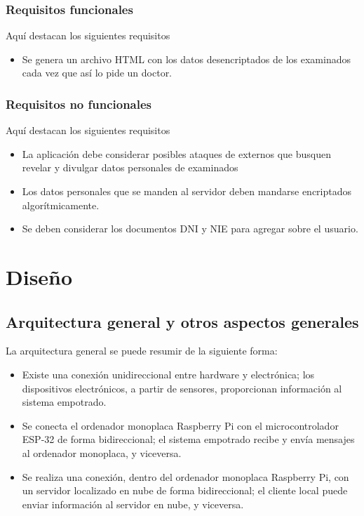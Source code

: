 \documentclass[12pt,a4paper,twoside,openright]{book}
\begin{document}
\subsection{Requisitos funcionales}

Aquí destacan los siguientes requisitos

\begin{itemize}
  \item [RF3] Se genera un archivo HTML con los datos desencriptados de los examinados cada vez que así lo pide un doctor.
\end{itemize}

\subsection{Requisitos no funcionales}

Aquí destacan los siguientes requisitos

\begin{itemize}
  \item [RNF1] La aplicación debe considerar posibles ataques de externos que busquen revelar y divulgar datos personales de examinados
  \item [RNF2] Los datos personales que se manden al servidor deben mandarse encriptados algorítmicamente.
  \item [RNF3] Se deben considerar los documentos DNI y NIE para agregar sobre el usuario.

\end{itemize}

\chapter{Diseño}

\section{Arquitectura general y otros aspectos generales}

La arquitectura general se puede resumir de la siguiente forma:

\begin{itemize}
  \item Existe una conexión unidireccional entre hardware y electrónica; los dispositivos electrónicos, a partir de sensores, proporcionan información al sistema empotrado.
  \item Se conecta el ordenador monoplaca Raspberry Pi con el microcontrolador ESP-32 de forma bidireccional; el sistema empotrado recibe y envía mensajes al ordenador monoplaca, y viceversa.
  \item Se realiza una conexión, dentro del ordenador monoplaca Raspberry Pi, con un servidor localizado en nube de forma bidireccional; el cliente local puede enviar información al servidor en nube, y viceversa.  
\end{itemize}
\end{document}
